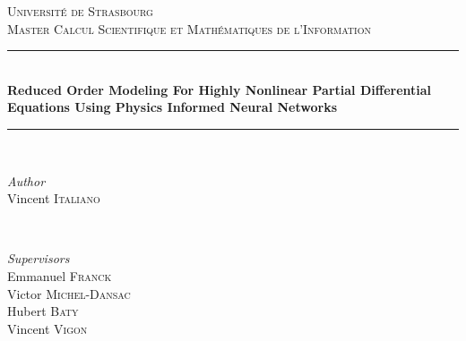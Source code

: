 \documentclass[12pt,openany]{amsbook}
\begin{document}
\begin{titlepage} %
	\newcommand{\HRule}{\rule{\linewidth}{0.5mm}} %
	
	\center %
	
	
	\textsc{\LARGE Université de Strasbourg}\\[2.5cm] %
	
	
	\textsc{\large Master Calcul Scientifique et Mathématiques de l'Information }\\[0.5cm] %
	
	
	\HRule\\[0.4cm]
	
	{\huge\bfseries Reduced Order Modeling For Highly Nonlinear Partial Differential Equations 
    Using Physics Informed Neural Networks}\\[0.4cm] %
	
	\HRule\\[1.5cm]
	
	
	\begin{minipage}{0.4\textwidth}
		\begin{flushleft}
			\large
			\textit{Author}\\
			Vincent \textsc{Italiano} %
		\end{flushleft}
	\end{minipage}
	~
	\begin{minipage}{0.4\textwidth}
		\begin{flushright}
			\large
			\textit{Supervisors}\\
			Emmanuel \textsc{Franck}\\ %
            Victor \textsc{Michel-Dansac}\\ %
            Hubert \textsc{Baty}\\ %
            Vincent \textsc{Vigon} %
		\end{flushright}
	\end{minipage}
	

\end{titlepage}
\end{document}
